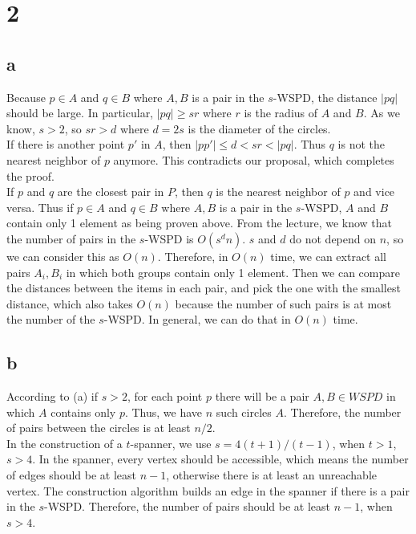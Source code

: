 \section*{2}
\subsection*{a}

Because $p \in A$ and $q \in B$ where ${A,B}$ is a pair in the $s$-WSPD, the distance $|pq|$ should be large. In particular, $|pq| \geq sr$ where $r$ is the radius of $A$ and $B$. As we know, $s > 2$, so $sr > d$ where $d = 2s$ is the diameter of the circles. \\

If there is another point $p'$ in $A$, then $|pp'| \leq d < sr < |pq|$. Thus $q$ is not the nearest neighbor of $p$ anymore. This contradicts our proposal, which completes the proof.\\

If $p$ and $q$ are the closest pair in $P$, then $q$ is the nearest neighbor of $p$ and vice versa. Thus if $p \in A$ and $q \in B$ where ${A,B}$ is a pair in the $s$-WSPD, $A$ and $B$ contain only 1 element as being proven above. From the lecture, we know that the number of pairs in the $s$-WSPD is $O(s^d n)$. $s$ and $d$ do not depend on $n$, so we can consider this as $O(n)$. Therefore, in $O(n)$ time, we can extract all pairs ${A_i, B_i}$ in which both groups contain only 1 element. Then we can compare the distances between the items in each pair, and pick the one with the smallest distance, which also takes $O(n)$ because the number of such pairs is at most the number of the $s$-WSPD. In general, we can do that in $O(n)$ time.\\

\subsection*{b}
According to (a) if $s > 2$, for each point $p$ there will be a pair ${A,B} \in WSPD$ in which $A$ contains only $p$.
Thus, we have $n$ such circles $A$. Therefore, the number of pairs between the circles is at least $n/2$. \\

In the construction of a $t$-spanner, we use $s = 4(t + 1) / (t - 1)$, when $t > 1$, $s > 4$.
In the spanner, every vertex should be accessible, which means the number of edges
should be at least $n - 1$, otherwise there is at least an unreachable vertex.
The construction algorithm builds an edge in the spanner if there is a pair in
the $s$-WSPD. Therefore, the number of pairs should be at least $n - 1$, when $s > 4$. \\

